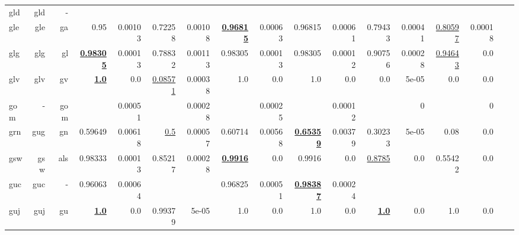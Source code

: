 \documentclass[11pt]{article}
\begin{document}
\begin{table*}[h]
{\begin{tabular}{lrrrrrrrrrrrrrrrr}
gld         & gld         & -         &          &          &          &          &          &          &          &          &          &          &          &          \\
gle         & gle         & ga         & 0.95         & 0.00103         & 0.72258         & 0.00108         & \textbf{\underline{0.96815}}         & 0.00063         & 0.96815         & 0.00061         & 0.79433         & 0.00041         & \underline{0.80597}         & 0.00018         \\
glg         & glg         & gl         & \textbf{\underline{0.98305}}         & 0.00013         & 0.78832         & 0.00113         & 0.98305         & 0.00013         & 0.98305         & 0.00012         & 0.90756         & 0.00028         & \underline{0.94643}         & 0.0         \\
glv         & glv         & gv         & \textbf{\underline{1.0}}         & 0.0         & \underline{0.08571}         & 0.00038         & 1.0         & 0.0         & 1.0         & 0.0         & 0.0         & 5e-05         & 0.0         & 0.0         \\
gom         & -         & gom         &          & 0.00051         &          & 0.00028         &          & 0.00025         &          & 0.00012         &          & 0         &          & 0         \\
grn         & gug         & gn         & 0.59649         & 0.00618         & \underline{0.5}         & 0.00057         & 0.60714         & 0.00568         & \textbf{\underline{0.65359}}         & 0.00379         & 0.30233         & 5e-05         & 0.08         & 0.0         \\
gsw         & gsw         & als         & 0.98333         & 0.00013         & 0.85217         & 0.00028         & \textbf{\underline{0.9916}}         & 0.0         & 0.9916         & 0.0         & \underline{0.8785}         & 0.0         & 0.55422         & 0.0         \\
guc         & guc         & -         & 0.96063         & 0.00064         &          &          & 0.96825         & 0.00051         & \textbf{\underline{0.98387}}         & 0.00024         &          &          &          &          \\
guj         & guj         & gu         & \textbf{\underline{1.0}}         & 0.0         & 0.99379         & 5e-05         & 1.0         & 0.0         & 1.0         & 0.0         & \textbf{\underline{1.0}}         & 0.0         & 1.0         & 0.0         \\

\end{tabular}}
\end{table*}
\end{document}
